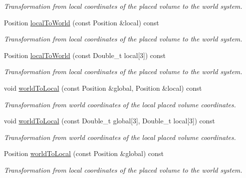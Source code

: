 \begin{DoxyCompactItemize}
\begin{DoxyCompactList}\small\item\em Transformation from local coordinates of the placed volume to the world system. \end{DoxyCompactList}\item 
Position \hyperlink{class_d_d4hep_1_1_alignments_1_1_alignment_data_a6576f66fc1a7edfa1330a1e176014acf}{local\+To\+World} (const Position \&local) const
\begin{DoxyCompactList}\small\item\em Transformation from local coordinates of the placed volume to the world system. \end{DoxyCompactList}\item 
Position \hyperlink{class_d_d4hep_1_1_alignments_1_1_alignment_data_a662ee0cd2932cadb2487e9ddf0f25e1f}{local\+To\+World} (const Double\+\_\+t local\mbox{[}3\mbox{]}) const
\begin{DoxyCompactList}\small\item\em Transformation from local coordinates of the placed volume to the world system. \end{DoxyCompactList}\item 
void \hyperlink{class_d_d4hep_1_1_alignments_1_1_alignment_data_aa9a06d09e56fd93a48cce689a654884e}{world\+To\+Local} (const Position \&global, Position \&local) const
\begin{DoxyCompactList}\small\item\em Transformation from world coordinates of the local placed volume coordinates. \end{DoxyCompactList}\item 
void \hyperlink{class_d_d4hep_1_1_alignments_1_1_alignment_data_acfd97cb0ade9c1c6cc2a30784686e7ff}{world\+To\+Local} (const Double\+\_\+t global\mbox{[}3\mbox{]}, Double\+\_\+t local\mbox{[}3\mbox{]}) const
\begin{DoxyCompactList}\small\item\em Transformation from world coordinates of the local placed volume coordinates. \end{DoxyCompactList}\item 
Position \hyperlink{class_d_d4hep_1_1_alignments_1_1_alignment_data_a7ffad9495bb924203e294f96f20d9453}{world\+To\+Local} (const Position \&global) const
\begin{DoxyCompactList}\small\item\em Transformation from local coordinates of the placed volume to the world system. \end{DoxyCompactList}\item 

\end{DoxyCompactItemize}
